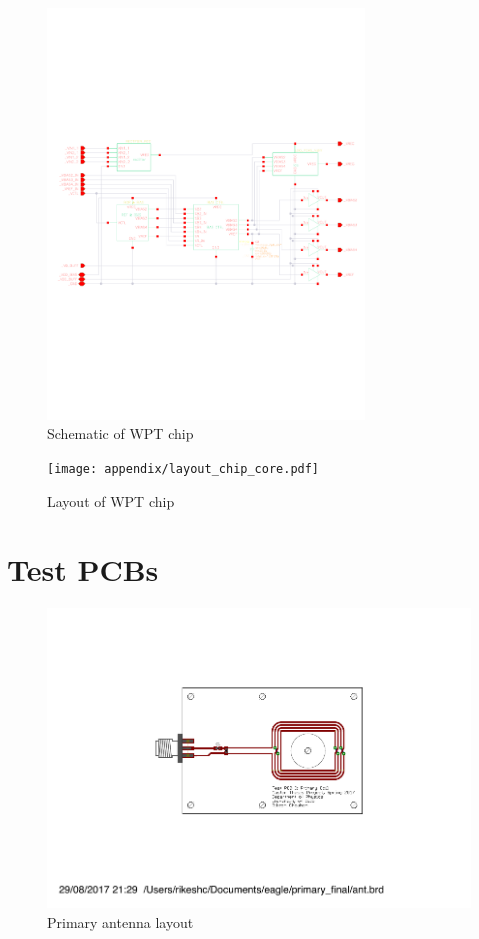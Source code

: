 \documentclass[12pt,a4paper,UKenglish]{report}
\begin{document}
\begin{appendices}
\begin{figure} [!htbp]	%
 	\centering
  	\includegraphics[angle=90, width=0.75\textwidth]{appendix/schematic_chip_p.pdf} 
 	\caption{Schematic of WPT chip} 
	\label{fig:appen_schematic_chip} 
\end{figure}

\begin{figure} [!htbp]	%
 	\centering
  	\texttt{[image: appendix/layout\_chip\_core.pdf]} 
 	\caption{Layout of WPT chip} 
	\label{fig:appen_layout_chip} 
\end{figure}

\chapter{Test PCBs}
\newpage
\begin{figure} [!htbp]	%
 	\centering
  	\includegraphics[width=1\textwidth]{appendix/pcb_pri.pdf} 
 	\caption{Primary antenna layout} 
	\label{fig:appen_primary_layout} 
\end{figure}


\end{appendices}
\end{document}
